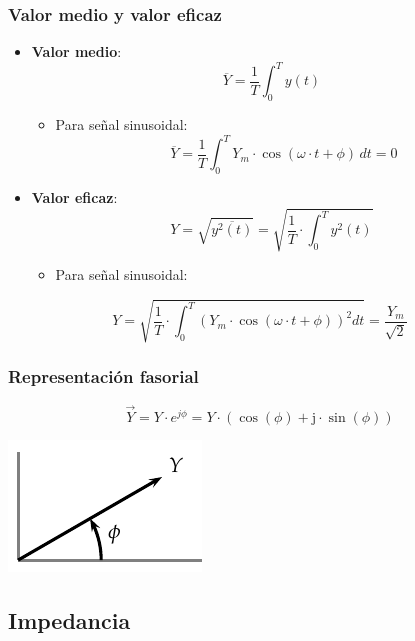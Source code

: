 \documentclass[serif, xcolor=dvipsnames]{beamer}
\begin{document}
\begin{frame}
  \frametitle{Valor medio y valor eficaz}
  \begin{itemize}
  \item \textbf{Valor medio}:
    \[
    \overline{Y}=\frac{1}{T}\int_{0}^{T}y(t)
    \]


    \begin{itemize}
    \item Para señal sinusoidal:
      \[
      \overline{Y}=\frac{1}{T}\int_{0}^{T}Y_{m}\cdot\cos(\omega\cdot
      t+\phi)\, dt=0
      \]

    \end{itemize}
  \item \textbf{Valor eficaz}:
    \[
    Y=\sqrt{\overline{y^{2}(t)}}=\sqrt{\frac{1}{T}\cdot\int_{0}^{T}y^{2}(t)}
    \]


    \begin{itemize}
    \item Para señal sinusoidal:
    \end{itemize}
  \end{itemize}
  \[
  Y=\sqrt{\frac{1}{T}\cdot\int_{0}^{T}\left(Y_{m}\cdot\cos(\omega\cdot
      t+\phi)\right)^{2}dt}=\frac{Y_{m}}{\sqrt{2}}
  \]



\end{frame}
\begin{frame}
  \frametitle{Representación fasorial}

\[
\vec{Y}=Y\cdot e^{j\phi}=Y\cdot(\cos(\phi)+\mathrm{j}\cdot\sin(\phi))
\]


\begin{center}
  \includegraphics{../figs/Fasor}
  \par\end{center}


\end{frame}
\subsection{Impedancia}
\end{document}
